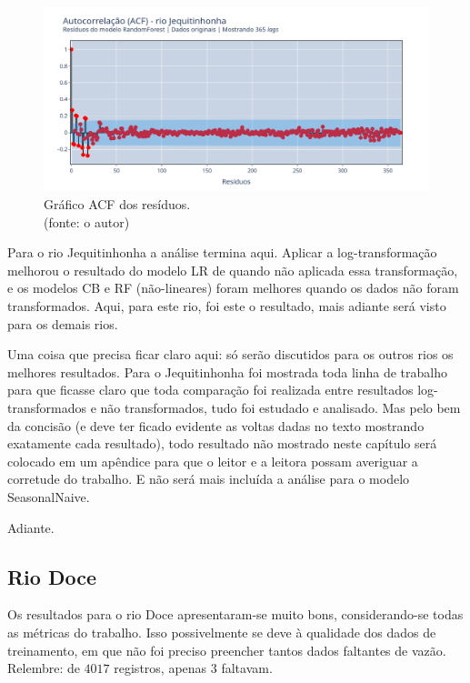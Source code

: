 \begin{figure}[!h]
\centering
\includegraphics[scale=0.33]{Figuras/jequiti/wfv/RF/RF_WFV_ORIG_RESID_ACF.png}
\caption{Gráfico ACF dos resíduos.\\(fonte: o autor)}
\label{fig:jequiti_RF_WFV_ORIG_RESID_ACF}
\end{figure}
\clearpage

Para o rio Jequitinhonha a análise termina aqui. Aplicar a log-transformação melhorou o resultado do modelo LR de quando não aplicada essa transformação, e os modelos CB e RF (não-lineares) foram melhores quando os dados não foram transformados. Aqui, para este rio, foi este o resultado, mais adiante será visto para os demais rios.

Uma coisa que precisa ficar claro aqui: só serão discutidos para os outros rios os melhores resultados. Para o Jequitinhonha foi mostrada toda linha de trabalho para que ficasse claro que toda comparação foi realizada entre resultados log-transformados e não transformados, tudo foi estudado e analisado. Mas pelo bem da concisão (e deve ter ficado evidente as voltas dadas no texto mostrando exatamente cada resultado), todo resultado não mostrado neste capítulo será colocado em um apêndice para que o leitor e a leitora possam averiguar a corretude do trabalho. E não será mais incluída a análise para o modelo SeasonalNaive.

Adiante.

\subsection{Rio Doce}

Os resultados para o rio Doce apresentaram-se muito bons, considerando-se todas as métricas do trabalho. Isso possivelmente se deve à qualidade dos dados de treinamento, em que não foi preciso preencher tantos dados faltantes de vazão. Relembre: de $4017$ registros, apenas $3$ faltavam.

